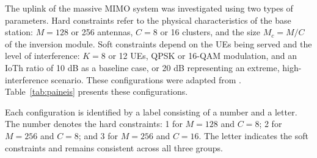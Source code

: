 The uplink of the massive MIMO system was investigated using two types of parameters. Hard constraints refer to the physical characteristics of the base station: $M = 128$ or 256 antennas, $C = 8$ or 16 clusters, and the size $M_c = M/C$ of the inversion module. Soft constraints depend on the UEs being served and the level of interference: $K = 8$ or 12 UEs, QPSK or 16-QAM modulation, and an IoTh ratio of 10 dB as a baseline case, or 20 dB representing an extreme, high-interference scenario. These configurations were adapted from \cite{zhao2025jsac}. Table~\ref{tab:paineis} presents these configurations.


Each configuration is identified by a label consisting of a number and a letter. The number denotes the hard constraints: 1 for $M = 128$ and $C = 8$; 2 for $M = 256$ and $C = 8$; and 3 for $M = 256$ and $C = 16$. The letter indicates the soft constraints and remains consistent across all three groups.

